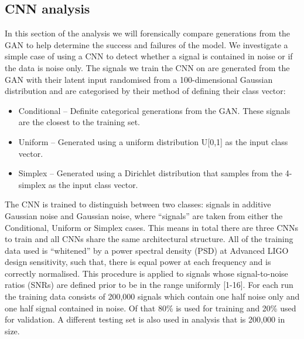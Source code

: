 \documentclass[12pt]{iopart}
\begin{document}

\subsection{CNN analysis}
In this section of the analysis we will forensically compare generations from the GAN to help determine the success and failures of the model. We investigate a simple case of using a CNN to detect whether a signal is contained in noise or if the data is noise only. The signals we train the CNN on are generated from the GAN with their latent input randomised from a 100-dimensional Gaussian distribution and are categorised by their method of defining their class vector: 
\begin{itemize}
	\item Conditional – Definite categorical generations from the GAN. These signals are the closest to the training set.
	\item Uniform – Generated using a uniform distribution U[0,1] as the input class vector.
	\item Simplex – Generated using a Dirichlet distribution that samples from the 4-simplex as the input class vector. 
\end{itemize}
The CNN is trained to distinguish between two classes: signals in additive Gaussian noise and Gaussian noise, where “signals” are taken from either the Conditional, Uniform or Simplex cases. This means in total there are three CNNs to train and all CNNs share the same architectural structure. All of the training data used is “whitened” by a power spectral density (PSD) at Advanced LIGO design sensitivity, such that, there is equal power at each frequency and is correctly normalised. This procedure is applied to signals whose signal-to-noise ratios (SNRs) are defined prior to be in the range uniformly [1-16]. For each run the training data consists of 200,000 signals which contain one half noise only and one half signal contained in noise. Of that 80\% is used for training and 20\% used for validation. A different testing set is also used in analysis that is 200,000 in size. 
\end{document}

